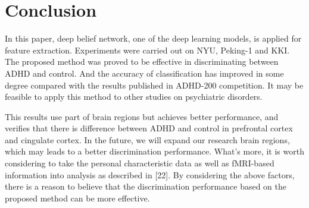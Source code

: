 \documentclass{llncs}
\begin{document}
\section{Conclusion}
In this paper, deep belief network, one of the deep learning models, is applied for feature extraction. Experiments were carried out on NYU, Peking-1 and KKI. The proposed method was proved to be effective in discriminating between ADHD and control. And the accuracy of classification has improved in some degree compared with the results published in ADHD-200 competition. It may be feasible to apply this method to other studies on psychiatric disorders.


This results use part of brain regions but achieves better performance, and verifies that there is difference between ADHD and control in prefrontal cortex and cingulate cortex. In the future, we will expand our research brain regions, which may leads to a better discrimination performance. What's more, it is worth considering to take the personal characteristic data as well as fMRI-based information into analysis as described in [22]. By considering the above factors, there is a reason to believe that the discrimination performance based on the proposed method can be more effective.  
\end{document}
